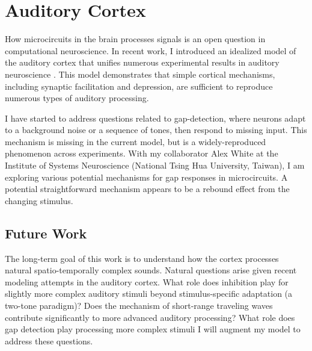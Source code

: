 \documentclass[a4paper,11pt]{article}
\begin{document}
	\section{Auditory Cortex}\label{sec:data}
	
	How microcircuits in the brain processes signals is an open question in computational neuroscience. In recent work, I introduced an idealized model of the auditory cortex that unifies numerous experimental results in auditory neuroscience \cite{park2020circuit}. This model demonstrates that simple cortical mechanisms, including synaptic facilitation and depression, are sufficient to reproduce numerous types of auditory processing.
    
    I have started to address questions related to gap-detection, where neurons adapt to a background noise or a sequence of tones, then respond to missing input. This mechanism is missing in the current model, but is a widely-reproduced phenomenon across experiments. With my collaborator Alex White at the Institute of Systems Neuroscience (National Tsing Hua University, Taiwan), I am exploring various potential mechanisms for gap responses in microcircuits. A potential straightforward mechanism appears to be a rebound effect from the changing stimulus.
    
	
	\subsection{Future Work}    
	The long-term goal of this work is to understand how the cortex processes natural spatio-temporally complex sounds. Natural questions arise given recent modeling attempts in the auditory cortex. What role does inhibition play for slightly more complex auditory stimuli beyond stimulus-specific adaptation (a two-tone paradigm)? Does the mechanism of short-range traveling waves contribute significantly to more advanced auditory processing? What role does gap detection play processing more complex stimuli I will augment my model to address these questions.
	
\end{document}
